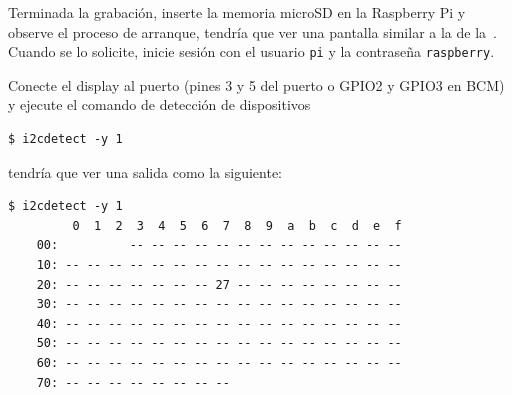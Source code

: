 Terminada la grabación, inserte la memoria microSD en la Raspberry Pi y observe el proceso de arranque, tendría que ver una pantalla similar a la de la~.
Cuando se lo solicite, inicie sesión con el usuario \texttt{pi} y la contraseña \texttt{raspberry}.


Conecte el display al puerto \IIC{} (pines 3 y 5 del puerto o GPIO2 y GPIO3 en BCM) y ejecute el comando de detección de dispositivos

\begin{Verbatim}[gobble=1]
	$ i2cdetect -y 1
\end{Verbatim}

\noindent
tendría que ver una salida como la siguiente:

\begin{Verbatim}[gobble=1]
	$ i2cdetect -y 1
	     0  1  2  3  4  5  6  7  8  9  a  b  c  d  e  f
	00:          -- -- -- -- -- -- -- -- -- -- -- -- --
	10: -- -- -- -- -- -- -- -- -- -- -- -- -- -- -- --
	20: -- -- -- -- -- -- -- 27 -- -- -- -- -- -- -- --
	30: -- -- -- -- -- -- -- -- -- -- -- -- -- -- -- --
	40: -- -- -- -- -- -- -- -- -- -- -- -- -- -- -- --
	50: -- -- -- -- -- -- -- -- -- -- -- -- -- -- -- --
	60: -- -- -- -- -- -- -- -- -- -- -- -- -- -- -- --
	70: -- -- -- -- -- -- -- --
\end{Verbatim}
